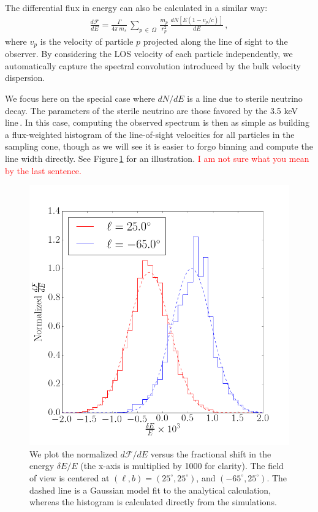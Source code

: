 \documentclass[aps,prd,10pt,twocolumn,superscriptaddress,showpacs]{revtex4-1}
\begin{document}
The differential flux in energy can also be calculated in a similar way:
\begin{eqnarray}
\label{eq:discrete}
\frac{d\mathcal{F}}{dE} = \frac{\Gamma}{4 \pi \, m_s}\, \sum_{p \, \in \, \Omega} \, \frac{m_p}{r_p^{2}} \, \frac{dN[E(1-v_p/c)]}{dE} \, ,
\end{eqnarray}
where $v_p$ is the velocity of particle $p$ projected along the line of sight to the observer.  By
considering the LOS velocity of each particle independently, we automatically capture the spectral
convolution introduced by the bulk velocity dispersion. 

We focus here on the special case where $dN/dE$ is a line due to sterile neutrino decay.  The parameters of the sterile neutrino are those favored by the 3.5 keV line\,\cite{Bulbul:2014sua}.  In this case, computing the observed spectrum is then as simple as building a flux-weighted histogram of the line-of-sight velocities for all particles in the sampling cone, though as we will see it is easier to forgo binning and compute the line width directly. See Figure\,\ref{fig:dfde} for an illustration.  \textcolor{red}{I am not sure what you mean by the last sentence.}

\begin{figure}[h!]
\centering
\includegraphics[width=1.0\columnwidth]{dnde_demo.png}
\caption{We plot the normalized $d\mathcal{F}/dE$ versus the fractional shift in the energy $\delta E/E$ (the x-axis is multiplied by 1000 for clarity).   The field of view is centered at $(\ell, b) = (25^\circ, 25^\circ)$, and $(-65^\circ, 25^\circ)$.  The dashed line is a Gaussian model fit to the analytical calculation, whereas the histogram is calculated directly from the simulations.}
\label{fig:dfde}
\end{figure}
\end{document}
